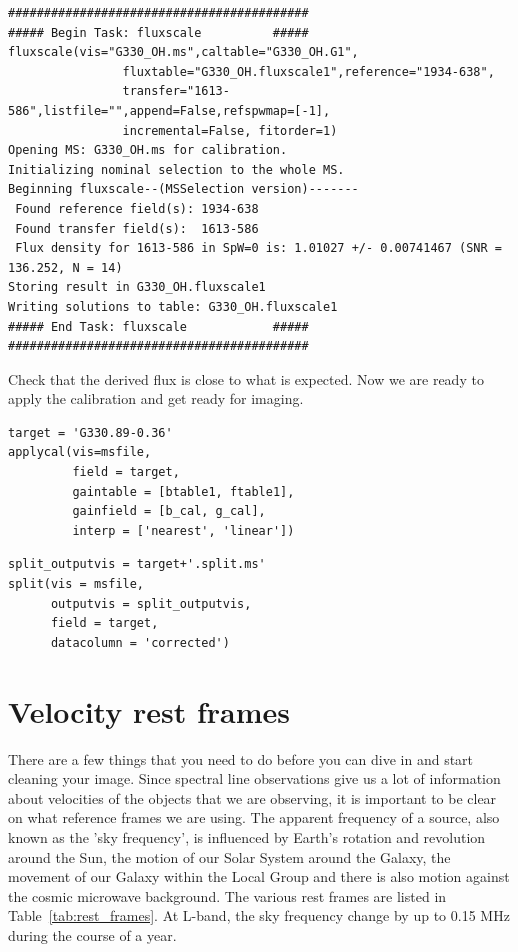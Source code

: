 \documentclass[force,almostfull,justified]{tufte-book}
\begin{document}
\begin{casaoutput}
\begin{verbatim}
##########################################
##### Begin Task: fluxscale          #####
fluxscale(vis="G330_OH.ms",caltable="G330_OH.G1",
                fluxtable="G330_OH.fluxscale1",reference="1934-638",
                transfer="1613-586",listfile="",append=False,refspwmap=[-1],
                incremental=False, fitorder=1)
Opening MS: G330_OH.ms for calibration.
Initializing nominal selection to the whole MS.
Beginning fluxscale--(MSSelection version)-------
 Found reference field(s): 1934-638
 Found transfer field(s):  1613-586
 Flux density for 1613-586 in SpW=0 is: 1.01027 +/- 0.00741467 (SNR = 136.252, N = 14)
Storing result in G330_OH.fluxscale1
Writing solutions to table: G330_OH.fluxscale1
##### End Task: fluxscale            #####
##########################################
\end{verbatim}
\end{casaoutput}

Check that the derived flux is close to what is expected.  Now we are
ready to apply the calibration and get ready for imaging.

\begin{casacmd}
\begin{verbatim}
target = 'G330.89-0.36'
applycal(vis=msfile,
         field = target,
         gaintable = [btable1, ftable1],
         gainfield = [b_cal, g_cal],
         interp = ['nearest', 'linear'])
\end{verbatim}
\end{casacmd}

\begin{casacmd}
\begin{verbatim}
split_outputvis = target+'.split.ms'
split(vis = msfile,
      outputvis = split_outputvis,
      field = target,
      datacolumn = 'corrected')
\end{verbatim}
\end{casacmd}


\section{Velocity rest frames}

There are a few things that you need to do before you can dive in and
start cleaning your image.  Since spectral line observations give us a
lot of information about velocities of the objects that we are
observing, it is important to be clear on what reference frames we are
using.  The apparent frequency of a source, also known as the 'sky
frequency', is influenced by Earth's rotation and revolution around the
Sun, the motion of our Solar System around the Galaxy, the movement of
our Galaxy within the Local Group and there is also motion against the
cosmic microwave background.  The various rest frames are listed in
Table~\ref{tab:rest_frames}. At L-band, the sky frequency change by up
to 0.15 MHz during the course of a year.
\end{document}
